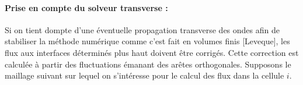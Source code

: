 \paragraph*{Prise en compte du solveur transverse :} Si on tient dompte d'une éventuelle propagation transverse des ondes afin de stabiliser la méthode numérique comme c'est fait en volumes finis [Leveque], les flux aux interfaces déterminés plus haut doivent être corrigés. Cette correction est calculée à partir des fluctuations émanant des arêtes orthogonales. Supposons le maillage suivant sur lequel on s'intéresse pour le calcul des flux dans la cellule $i$.

